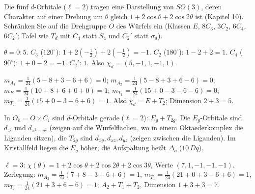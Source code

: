 \begin{aufgabe}
Die fünf $d$-Orbitale ($\ell = 2$) tragen eine Darstellung von $SO(3)$, deren Charakter auf einer Drehung um $\theta$ gleich $1 + 2\cos\theta + 2\cos2\theta$ ist (Kapitel 10). Schränken Sie auf die Drehgruppe $O$ des Würfels ein (Klassen $E$, $8C_3$, $3C_2$, $6C_4$, $6C_2'$; Tafel wie $T_d$ mit $C_4$ statt $S_4$ und $C_2'$ statt $\sigma_d$).

\loesung
{}
$\theta = 0\colon5$. $C_3$ ($120^{\circ}$): $1 + 2(-\tfrac12) + 2(-\tfrac12) = -1$. $C_2$ ($180^{\circ}$): $1 - 2 + 2 = 1$. $C_4$ ($90^{\circ}$): $1 + 0 - 2 = -1$. $C_2'$: $1$. Also $\chi_d = (5, -1, 1, -1, 1)$.

$m_{A_1} = \frac1{24}(5 - 8 + 3 - 6 + 6) = 0$; $m_{A_2} = \frac1{24}(5 - 8 + 3 + 6 - 6) = 0$; $m_E = \frac1{24}(10 + 8 + 6 + 0 + 0) = 1$; $m_{T_1} = \frac1{24}(15 + 0 - 3 - 6 - 6) = 0$; $m_{T_2} = \frac1{24}(15 + 0 - 3 + 6 + 6) = 1$. Also $\chi_d = E + T_2$; Dimension $2 + 3 = 5$. \checkmark

In $O_h = O\times C_i$ sind $d$-Orbitale gerade ($\ell = 2$): $E_g + T_{2g}$. Die $E_g$-Orbitale sind $d_{z^{2}}$ und $d_{x^{2} - y^{2}}$ (zeigen auf die Würfelflächen, wo in einem Oktaederkomplex die Liganden sitzen), die $T_{2g}$ sind $d_{xy}, d_{xz}, d_{yz}$ (zeigen zwischen die Liganden). Im Kristallfeld liegen die $E_g$ höher; die Aufspaltung heißt $\Delta_o$ ($10\,Dq$).

$\ell = 3$: $\chi(\theta) = 1 + 2\cos\theta + 2\cos2\theta + 2\cos3\theta$, Werte $(7, 1, -1, -1, -1)$. Zerlegung: $m_{A_2} = \frac1{24}(7 + 8 - 3 + 6 + 6) = 1$, $m_{T_1} = \frac1{24}(21 + 0 + 3 - 6 + 6) = 1$, $m_{T_2} = \frac1{24}(21 + 3 + 6 - 6) = 1$; $A_2 + T_1 + T_2$, Dimension $1 + 3 + 3 = 7$. \checkmark

\begin{center}
\begin{minipage}{0.88\textwidth}
\end{minipage}
\end{center}
\end{aufgabe}

